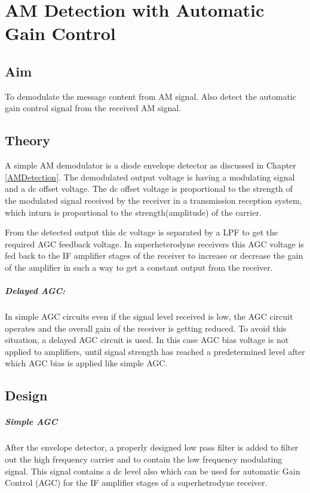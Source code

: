 \chapter[AM Detection with Automatic Gain Control]{AM Detection with Automatic Gain Control}
\section*{Aim}
To demodulate the message content from AM signal. Also detect the automatic gain control signal from the received AM signal.
\section*{Theory}


A simple AM demodulator is a diode envelope detector as discussed in  Chapter \ref{AMDetection}. The demodulated output voltage is having a modulating signal and a dc offset voltage. The dc offset voltage is proportional to the strength of the modulated signal received by the receiver in a transmission reception system, which inturn is proportional to the strength(amplitude) of the carrier.

From the detected output this dc voltage is separated by a LPF to get the required AGC feedback voltage. In superheterodyne receivers this AGC voltage is fed back to the IF amplifier stages of the receiver to increase or decrease the gain of the amplifier in such a way to get a constant output from the receiver.

\paragraph{Delayed AGC:}In simple AGC circuits even if the signal level received is low, the AGC circuit operates and the overall gain of the receiver is getting reduced. To avoid this situation, a delayed AGC circuit is used. In this case AGC bias voltage is not applied to amplifiers, until signal strength has reached a predetermined level after which AGC bias is applied like simple AGC.

\section*{Design}
\paragraph{Simple AGC}
 After the envelope detector, a properly designed low pass filter is added to filter out the high frequency carrier and to contain the low frequency modulating signal. This signal contains a dc level also which can be used for automatic Gain Control (AGC) for the IF amplifier stages of a superhetrodyne receiver.

